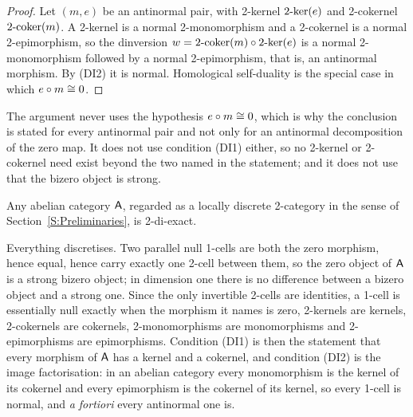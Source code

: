 \begin{proof}
  \leanok
  Let \((m,e)\) be an antinormal pair, with 2-kernel \(2\text{-}\mathrm{ker}(e)\) and 2-cokernel \(2\text{-}\mathrm{coker}(m)\). A 2-kernel is a normal 2-monomorphism and a 2-cokernel is a normal 2-epimorphism, so the dinversion \(w=2\text{-}\mathrm{coker}(m)\circ2\text{-}\mathrm{ker}(e)\) is a normal 2-monomorphism followed by a normal 2-epimorphism, that is, an antinormal morphism. By \textup{(DI2)} it is normal. Homological self-duality is the special case in which \(e\circ m\cong 0\).
\end{proof}

\begin{remark}
  \label{Rem Bridge Cost}
  The argument never uses the hypothesis \(e\circ m\cong 0\), which is why the conclusion is stated for every antinormal pair and not only for an antinormal decomposition of the zero map. It does not use condition \textup{(DI1)} either, so no 2-kernel or 2-cokernel need exist beyond the two named in the statement; and it does not use that the bizero object is strong.
\end{remark}

\begin{example}
  \label{Ex DiExact}
  Any abelian category \(\mathsf{A}\), regarded as a locally discrete 2-category in the sense of Section~\ref{S:Preliminaries}, is 2-di-exact.

	Everything discretises. Two parallel null 1-cells are both the zero morphism, hence equal, hence carry exactly one 2-cell between them, so the zero object of \(\mathsf{A}\) is a strong bizero object; in dimension one there is no difference between a bizero object and a strong one. Since the only invertible 2-cells are identities, a 1-cell is essentially null exactly when the morphism it names is zero, 2-kernels are kernels, 2-cokernels are cokernels, 2-monomorphisms are monomorphisms and 2-epimorphisms are epimorphisms. Condition \textup{(DI1)} is then the statement that every morphism of \(\mathsf{A}\) has a kernel and a cokernel, and condition \textup{(DI2)} is the image factorisation: in an abelian category every monomorphism is the kernel of its cokernel and every epimorphism is the cokernel of its kernel, so every 1-cell is normal, and \emph{a fortiori} every antinormal one is.
\end{example}

